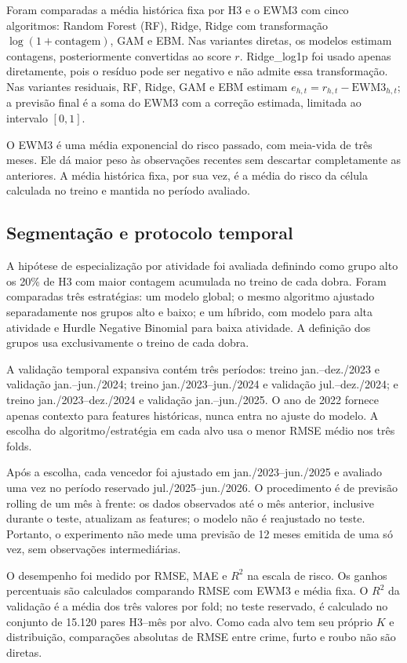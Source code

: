 \documentclass[12pt]{article}
\begin{document}
Foram comparadas a média histórica fixa por H3 e o EWM3 com cinco algoritmos: Random Forest (RF), Ridge, Ridge com transformação $\log(1+\text{contagem})$, GAM e EBM. Nas variantes diretas, os modelos estimam contagens, posteriormente convertidas ao score $r$. Ridge\_log1p foi usado apenas diretamente, pois o resíduo pode ser negativo e não admite essa transformação. Nas variantes residuais, RF, Ridge, GAM e EBM estimam $e_{h,t}=r_{h,t}-\mathrm{EWM3}_{h,t}$; a previsão final é a soma do EWM3 com a correção estimada, limitada ao intervalo $[0,1]$.

O EWM3 é uma média exponencial do risco passado, com meia-vida de três meses. Ele dá maior peso às observações recentes sem descartar completamente as anteriores. A média histórica fixa, por sua vez, é a média do risco da célula calculada no treino e mantida no período avaliado.

\subsection{Segmentação e protocolo temporal}

A hipótese de especialização por atividade foi avaliada definindo como grupo alto os 20\% de H3 com maior contagem acumulada no treino de cada dobra. Foram comparadas três estratégias: um modelo global; o mesmo algoritmo ajustado separadamente nos grupos alto e baixo; e um híbrido, com modelo para alta atividade e Hurdle Negative Binomial para baixa atividade. A definição dos grupos usa exclusivamente o treino de cada dobra.

A validação temporal expansiva contém três períodos: treino jan.--dez./2023 e validação jan.--jun./2024; treino jan./2023--jun./2024 e validação jul.--dez./2024; e treino jan./2023--dez./2024 e validação jan.--jun./2025. O ano de 2022 fornece apenas contexto para features históricas, nunca entra no ajuste do modelo. A escolha do algoritmo/estratégia em cada alvo usa o menor RMSE médio nos três folds.

Após a escolha, cada vencedor foi ajustado em jan./2023--jun./2025 e avaliado uma vez no período reservado jul./2025--jun./2026. O procedimento é de previsão rolling de um mês à frente: os dados observados até o mês anterior, inclusive durante o teste, atualizam as features; o modelo não é reajustado no teste. Portanto, o experimento não mede uma previsão de 12 meses emitida de uma só vez, sem observações intermediárias.

O desempenho foi medido por RMSE, MAE e $R^2$ na escala de risco. Os ganhos percentuais são calculados comparando RMSE com EWM3 e média fixa. O $R^2$ da validação é a média dos três valores por fold; no teste reservado, é calculado no conjunto de 15.120 pares H3--mês por alvo. Como cada alvo tem seu próprio $K$ e distribuição, comparações absolutas de RMSE entre crime, furto e roubo não são diretas.
\end{document}
